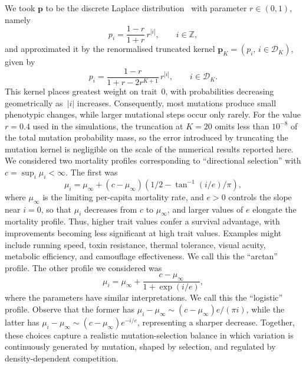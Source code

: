 \documentclass[12pt]{article}
\newcommand{\Z}{\ensuremath{\mathbb Z}}
\newcommand\D{\ensuremath{\mathcal{D}}}
\newcommand{\bp}{\boldsymbol{p}}
\begin{document}
We took $\bp$ to be the discrete Laplace distribution~\cite{IK06} with
parameter $r\in(0,1)$, namely
\begin{equation}
p_i=\frac{1-r}{1+r}\,r^{|i|},
\qquad i\in\Z,
\label{laplace}
\end{equation}
and approximated it by the renormalised 
truncated kernel $\bp_K=(p_i,\,i\in\D_K)$,
given by
\begin{equation}
p_i=
\frac{1-r}{1+r-2r^{K+1}}\,r^{|i|},
\qquad i\in\D_K.
\label{laplacet}
\end{equation}
This kernel places greatest weight on trait~0, with probabilities
decreasing geometrically as~$|i|$ increases. Consequently, most
mutations produce small phenotypic changes, while larger mutational
steps occur only rarely. For the value $r=0.4$ used in the simulations,
the truncation at $K=20$ omits less than $10^{-8}$ of the total mutation
probability mass, so the error introduced by truncating the mutation
kernel is negligible on the scale of the numerical results reported
here.
We considered two mortality profiles corresponding to
``directional selection'' with $c=\sup_i \mu_i<\infty$. The first was
$$
  \mu_i=\mu_\infty + (c-\mu_\infty)\left( 1/2 - \tan^{-1}(i/e)/\pi\right),
$$
where $\mu_\infty$ is the limiting per-capita mortality rate, and $e>0$
controls the slope near $i=0$, so that $\mu_i$ decreases from $c$ to
$\mu_\infty$, and larger values of $e$ elongate the mortality profile.
Thus, higher trait values confer a survival advantage, with improvements
becoming less significant at high trait values. Examples might include
running speed, toxin resistance, thermal tolerance, visual acuity,
metabolic efficiency, and camouflage effectiveness. We call this the
``arctan'' profile. The other profile we considered was
$$
\mu_i=\mu_\infty + \frac{c-\mu_\infty}{1+\exp(i/e)},
$$
where the parameters have similar interpretations. We call this the
``logistic'' profile. Observe that the former has 
$\mu_i-\mu_\infty\sim (c-\mu_\infty) e/(\pi i)$, 
while the latter has $\mu_i-\mu_\infty\sim
(c-\mu_\infty)e^{-i/e}$, representing a sharper decrease. Together,
these choices capture a realistic mutation-selection balance in which
variation is continuously generated by mutation, shaped by selection,
and regulated by density-dependent competition.
\end{document}
